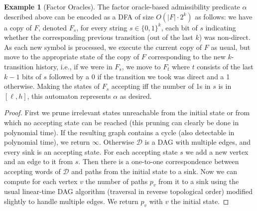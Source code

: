 \documentclass[a4paper,USenglish,numberwithinsect]{lipics}
\theoremstyle{plain}
\theoremstyle{definition}
\newtheorem{example-indexed-by-theorem}[theorem]{Example}
\begin{document}
\setcounter{section}{4}
\begin{example-indexed-by-theorem}[Factor Oracles]
The factor oracle-based admissibility predicate $\alpha$ described above can be encoded as a DFA of size $O(|F| \cdot 2^k)$ as follows: we have a copy of $F$, denoted $F_s$, for every string $s \in \{0,1\}^k$, each bit of $s$ indicating whether the corresponding previous transition (out of the last $k$) was non-direct. As each new symbol is processed, we execute the current copy of $F$ as usual, but move to the appropriate state of the copy of $F$ corresponding to the new $k$-transition history, i.e., if we were in $F_s$, we move to $F_t$ where $t$ consists of the last $k-1$ bits of $s$ followed by a 0 if the transition we took was direct and a 1 otherwise. Making the states of $F_s$ accepting iff the number of 1s in $s$ is in $[\ell,h]$, this automaton represents $\alpha$ as desired.
\end{example-indexed-by-theorem}

\lemmaDFACounting*
\begin{proof}
First we prune irrelevant states unreachable from the initial state or from which no accepting state can be reached (this pruning can clearly be done in polynomial time). If the resulting graph contains a cycle (also detectable in polynomial time), we return $\infty$. Otherwise $\mathcal{D}$ is a DAG with multiple edges, and every sink is an accepting state. For each accepting state $s$ we add a new vertex and an edge to it from $s$. Then there is a one-to-one correspondence between accepting words of $\mathcal{D}$ and paths from the initial state to a sink. Now we can compute for each vertex $v$ the number of paths $p_v$ from it to a sink using the usual linear-time DAG algorithm (traversal in reverse topological order) modified slightly to handle multiple edges. We return $p_v$ with $v$ the initial state.
\end{proof}
\end{document}
